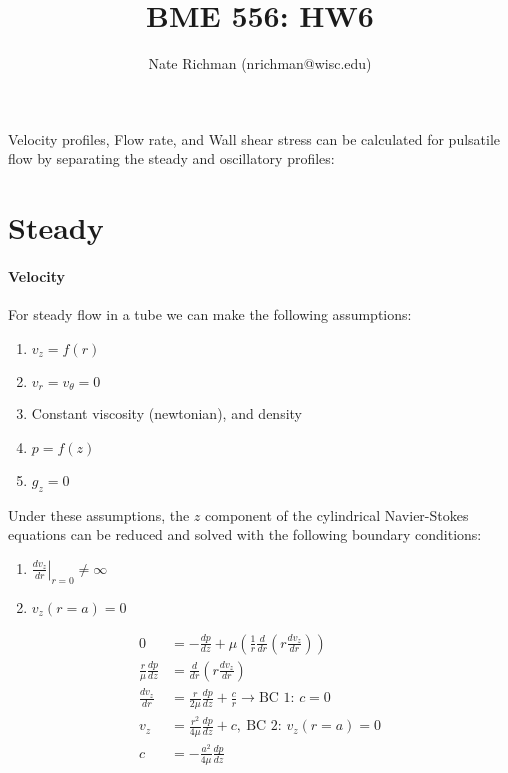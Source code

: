 \documentclass[11pt,letterpaper]{article}
\begin{document}
\title{BME 556: HW6}
\author{Nate Richman (nrichman@wisc.edu)}
\maketitle
Velocity profiles, Flow rate, and Wall shear stress can be calculated for pulsatile flow by separating the steady and oscillatory profiles:
\section*{Steady }
\paragraph{Velocity}
For steady flow in a tube we can make the following assumptions:
\begin{enumerate}
    \item $v_z = f(r)$
    \item $v_r = v_{\theta} = 0$
    \item Constant viscosity (newtonian), and density
    \item $p = f(z)$
    \item $g_z = 0$
\end{enumerate}
Under these assumptions, the $z$ component of the cylindrical Navier-Stokes equations can be reduced and solved with the following boundary conditions:
\begin{enumerate}
    \item $\displaystyle\left.\frac{d v_z}{d r}\right|_{r=0} \ne \infty$
    \item $v_z(r = a) = 0$
\end{enumerate}

\begin{align*}
    0 &= -     \frac{d p}{dz} + \mu \left( \frac{1}{r}     \frac{d }{d r} \left(r     \frac{d v_z}{d r}\right)\right)\\
    \frac{r}{\mu} \frac{d p}{d z} &= \frac{d}{d r} \left( r \frac{d v_z}{d r} \right)\\
    \frac{d v_z}{d r} &=\frac{r}{2 \mu} \frac{d p}{d z} + \frac{c}{r} \rightarrow \textrm{BC 1: $c = 0$} \\
    v_z &= \frac{r^2}{4 \mu}     \frac{d p}{dz} + c, \ \textrm{BC 2: $v_z(r=a) = 0$}\\
    c  &= -\frac{a^2}{4 \mu}     \frac{d p}{dz} \\
\end{align*}
\end{document}
